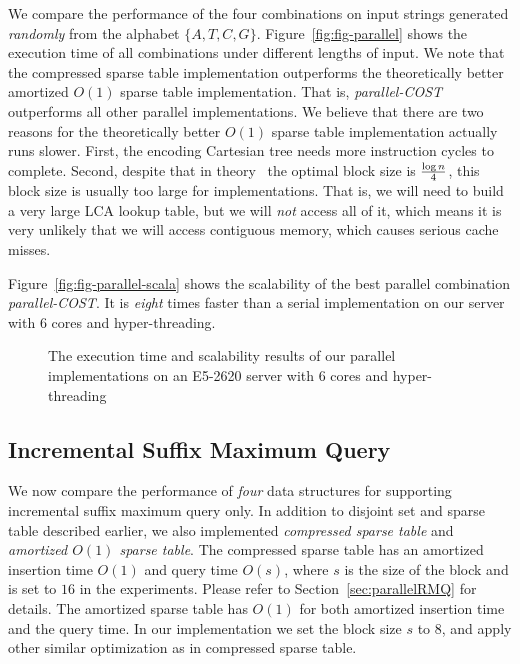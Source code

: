 We compare the performance of the four combinations on input strings
generated {\em randomly} from the alphabet $\{A, T, C, G\}$.
Figure~\ref{fig:fig-parallel} shows the execution time of all
combinations under different lengths of input.  We note that the
compressed sparse table implementation outperforms the theoretically
better amortized $O(1)$ sparse table implementation.  That is, {\em
parallel-COST} outperforms all other parallel implementations.  We
believe that there are two reasons for the theoretically better $O(1)$
sparse table implementation actually runs slower.  First, the encoding
Cartesian tree needs more instruction cycles to complete.  Second,
despite that in theory~\cite{Fischer2006TheoreticalAP} the optimal block
size is ${\log n}\over{4}$, this block size is usually too large for
implementations. That is, we will need to build a very large LCA lookup
table, but we will {\em not} access all of it, which means it is very
unlikely that we will access contiguous memory, which causes serious
cache misses.

Figure~\ref{fig:fig-parallel-scala} shows the scalability of the best
parallel combination {\em parallel-COST}.  It is {\em eight} times
faster than a serial implementation on our server with 6 cores and
hyper-threading.

\begin{figure}
  \centering
  \caption{The execution time and scalability results of our parallel
    implementations on an E5-2620 server with 6 cores and
    hyper-threading}
\end{figure}


\subsection{Incremental Suffix Maximum Query}

We now compare the performance of {\em four} data structures for
supporting incremental suffix maximum query only.  In addition to
disjoint set and sparse table described earlier, we also implemented
{\em compressed sparse table} and {\em amortized $O(1)$ sparse table}.
The compressed sparse table has an amortized insertion time $O(1)$ and
query time $O(s)$, where $s$ is the size of the block and is set to $16$
in the experiments.  Please refer to Section~\ref{sec:parallelRMQ} for
details.  The amortized sparse table has $O(1)$ for both amortized
insertion time and the query time.  In our implementation we set the
block size $s$ to $8$, and apply other similar optimization as in
compressed sparse table.

